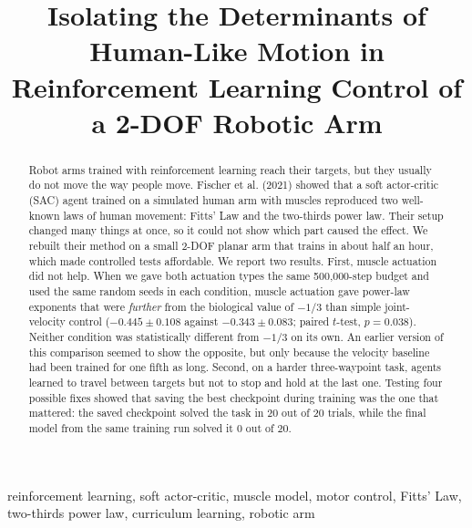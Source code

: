 \documentclass[conference]{IEEEtran}
\begin{document}
\title{Isolating the Determinants of Human-Like Motion in\\
Reinforcement Learning Control of a 2-DOF Robotic Arm}

\author{
}

\maketitle

\begin{abstract}
Robot arms trained with reinforcement learning reach their targets, but they
usually do not move the way people move. Fischer et al. (2021) showed that a
soft actor-critic (SAC) agent trained on a simulated human arm with muscles
reproduced two well-known laws of human movement: Fitts' Law and the two-thirds
power law. Their setup changed many things at once, so it could not show which
part caused the effect. We rebuilt their method on a small 2-DOF planar arm
that trains in about half an hour, which made controlled tests affordable. We
report two results. First, muscle actuation did not help. When we gave both
actuation types the same 500{,}000-step budget and used the same random seeds
in each condition, muscle actuation gave power-law exponents that were
\emph{further} from the biological value of $-1/3$ than simple joint-velocity
control ($-0.445 \pm 0.108$ against $-0.343 \pm 0.083$; paired $t$-test,
$p=0.038$). Neither condition was statistically different from $-1/3$ on its
own. An earlier version of this comparison seemed to show the opposite, but
only because the velocity baseline had been trained for one fifth as long.
Second, on a harder three-waypoint task, agents learned to travel between
targets but not to stop and hold at the last one. Testing four possible fixes
showed that saving the best checkpoint during training was the one that
mattered: the saved checkpoint solved the task in 20 out of 20 trials, while
the final model from the same training run solved it 0 out of 20.
\end{abstract}

\begin{IEEEkeywords}
reinforcement learning, soft actor-critic, muscle model, motor control,
Fitts' Law, two-thirds power law, curriculum learning, robotic arm
\end{IEEEkeywords}
\end{document}
